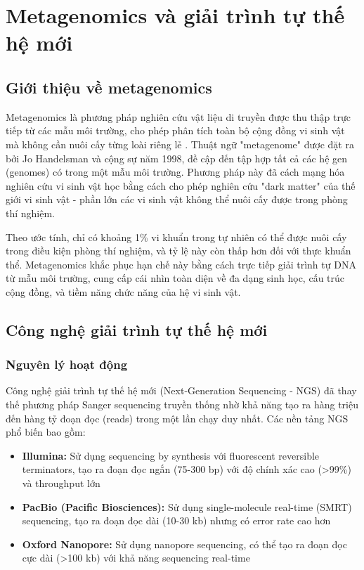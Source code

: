 \section{Metagenomics và giải trình tự thế hệ mới}
\label{sec:metagenomics}

\subsection{Giới thiệu về metagenomics}

Metagenomics là phương pháp nghiên cứu vật liệu di truyền được thu thập trực tiếp từ các mẫu môi trường, cho phép phân tích toàn bộ cộng đồng vi sinh vật mà không cần nuôi cấy từng loài riêng lẻ \cite{mokili2012metagenomics}. Thuật ngữ "metagenome" được đặt ra bởi Jo Handelsman và cộng sự năm 1998, đề cập đến tập hợp tất cả các hệ gen (genomes) có trong một mẫu môi trường. Phương pháp này đã cách mạng hóa nghiên cứu vi sinh vật học bằng cách cho phép nghiên cứu "dark matter" của thế giới vi sinh vật - phần lớn các vi sinh vật không thể nuôi cấy được trong phòng thí nghiệm.

Theo ước tính, chỉ có khoảng 1\% vi khuẩn trong tự nhiên có thể được nuôi cấy trong điều kiện phòng thí nghiệm, và tỷ lệ này còn thấp hơn đối với thực khuẩn thể. Metagenomics khắc phục hạn chế này bằng cách trực tiếp giải trình tự DNA từ mẫu môi trường, cung cấp cái nhìn toàn diện về đa dạng sinh học, cấu trúc cộng đồng, và tiềm năng chức năng của hệ vi sinh vật.

\subsection{Công nghệ giải trình tự thế hệ mới}

\subsubsection{Nguyên lý hoạt động}

Công nghệ giải trình tự thế hệ mới (Next-Generation Sequencing - NGS) đã thay thế phương pháp Sanger sequencing truyền thống nhờ khả năng tạo ra hàng triệu đến hàng tỷ đoạn đọc (reads) trong một lần chạy duy nhất. Các nền tảng NGS phổ biến bao gồm:

\begin{itemize}
    \item \textbf{Illumina:} Sử dụng sequencing by synthesis với fluorescent reversible terminators, tạo ra đoạn đọc ngắn (75-300 bp) với độ chính xác cao (>99\%) và throughput lớn

    \item \textbf{PacBio (Pacific Biosciences):} Sử dụng single-molecule real-time (SMRT) sequencing, tạo ra đoạn đọc dài (10-30 kb) nhưng có error rate cao hơn

    \item \textbf{Oxford Nanopore:} Sử dụng nanopore sequencing, có thể tạo ra đoạn đọc cực dài (>100 kb) với khả năng sequencing real-time
\end{itemize}


